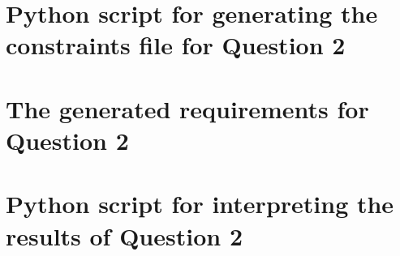 \begin{appendices}

\chapter{Python script for generating the constraints file for Question 2}
\label{app:2_gen.py}


\chapter{The generated requirements for Question 2}
\label{app:2_req.smt}


\chapter{Python script for interpreting the results of Question 2}
\label{app:2_draw.py}


\end{appendices}